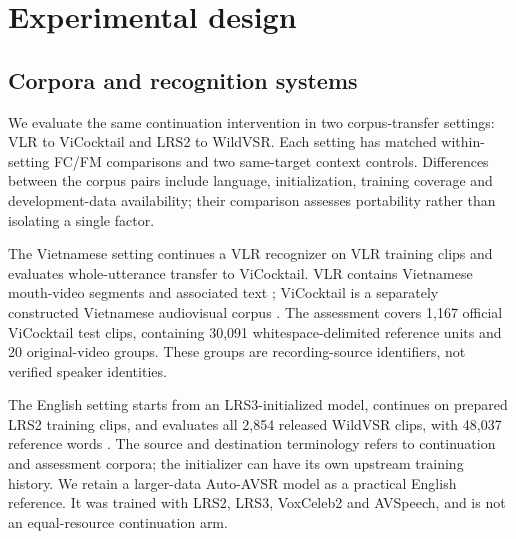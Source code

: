 \section{Experimental design}
\subsection{Corpora and recognition systems}
We evaluate the same continuation intervention in two corpus-transfer settings:
VLR to ViCocktail and LRS2 to WildVSR. Each setting has matched within-setting
FC/FM comparisons and two same-target context controls. Differences between
the corpus pairs include language, initialization, training coverage and
development-data availability; their comparison assesses portability rather
than isolating a single factor.

The Vietnamese setting continues a VLR recognizer on VLR training clips and
evaluates whole-utterance transfer to ViCocktail. VLR contains Vietnamese
mouth-video segments and associated text \cite{vlr2026dataset}; ViCocktail is a
separately constructed Vietnamese audiovisual corpus \cite{nguyen2025vicocktail}.
The assessment covers 1,167 official ViCocktail test clips, containing 30,091
whitespace-delimited reference units and 20 original-video groups. These groups
are recording-source identifiers, not verified speaker identities.

The English setting starts from an LRS3-initialized model, continues on prepared
LRS2 training clips, and evaluates all 2,854 released WildVSR clips, with 48,037
reference words \cite{afouras2022deep,afouras2018lrs3,djilali2024wildvsr}.
The source and destination terminology refers to continuation and assessment
corpora; the initializer can have its own upstream training history. We retain a
larger-data Auto-AVSR model as a practical English reference. It was trained with
LRS2, LRS3, VoxCeleb2 and AVSpeech, and is not an equal-resource continuation arm.

